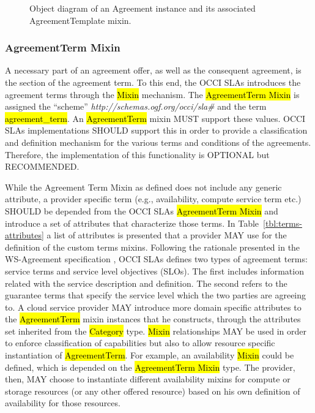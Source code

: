 \documentclass[10pt,a4paper]{article}
\begin{document}
\begin{figure}[!h]
	{\centering {} \par}
	\caption{Object diagram of an Agreement instance and its associated AgreementTemplate mixin.}
	\label{fig:template-example}
\end{figure}

\subsubsection{AgreementTerm Mixin}
A necessary part of an agreement offer, as well as the consequent agreement, is the section of the agreement term. To this end, the OCCI SLAs introduces the agreement terms through the \hl{Mixin} mechanism. The \hl{AgreementTerm Mixin} is assigned the “scheme” \textit{http://schemas.ogf.org/occi/sla\#} and the term \hl{agreement\_term}. An \hl{AgreementTerm} mixin MUST support these values. OCCI SLAs implementations SHOULD support this in order to provide a classification and definition mechanism for the various terms and conditions of the agreements. Therefore, the implementation of this functionality is OPTIONAL but RECOMMENDED.

While the Agreement Term Mixin as defined does not include any generic attribute, a provider specific term (e.g., availability, compute service term etc.) SHOULD be depended from the OCCI SLAs \hl{AgreementTerm Mixin} and introduce a set of attributes that characterize those terms. In Table~\ref{tbl:terms-attributes} a list of attributes is presented that a provider MAY use for the definition of the custom terms mixins. Following the rationale presented in the WS-Agreement specification \cite{ws-agreeement:2007} , OCCI SLAs defines two types of agreement terms: service terms and service level objectives (SLOs). The first includes information related with the service description and definition. The second refers to the guarantee terms that specify the service level which the two parties are agreeing to. A cloud service provider MAY introduce more domain specific attributes to the \hl{AgreementTerm} mixin instances that he constructs, through the attributes set inherited from the \hl{Category} type. \hl{Mixin} relationships MAY be used in order to enforce classification of capabilities but also to allow resource specific instantiation of \hl{AgreementTerm}. For example, an availability \hl{Mixin} could be defined, which is depended on the \hl{AgreementTerm Mixin} type. The provider, then, MAY choose to instantiate different availability mixins for compute or storage resources (or any other offered resource) based on his own definition of availability for those resources.
\end{document}
